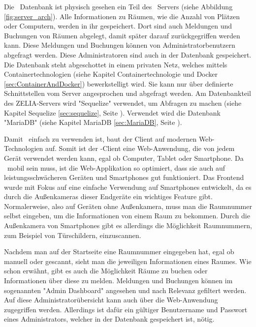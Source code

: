 Die \ZELIA\ Datenbank ist physisch gesehen ein Teil des \ZELIA\ Servers (siehe Abbildung \ref{fig:server_arch}). Alle Informationen zu Räumen, wie die Anzahl von Plätzen oder Computern, werden in ihr gespeichert. Dort sind auch Meldungen und Buchungen von Räumen abgelegt, damit später darauf zurückgegriffen werden kann. Diese Meldungen und Buchungen können von Administratorbenutzern abgefragt werden. Diese Administratoren sind auch in der Datenbank gespeichert. Die Datenbank steht abgeschottet in einem privaten Netz, welches mittels Containertechnologien (siehe Kapitel Containertechnologie und Docker \ref{sec:ContainerAndDocker}) bewerkstelligt wird. Sie kann nur über definierte Schnittstellen vom Server angesprochen und abgefragt werden. Am Datenbankteil des ZELIA-Servers wird "Sequelize" verwendet, um Abfragen zu machen (siehe Kapitel Sequelize \ref{sec:sequelize}, Seite \pageref{sec:sequelize}). Verwendet wird die Datenbank "MariaDB" (siehe Kapitel MariaDB \ref{sec:MariaDB}, Seite \pageref{sec:sequelize}).



Damit \ZELIA\ einfach zu verwenden ist, baut der Client auf modernen Web-\linebreak Technologien auf. Somit ist der \ZELIA-Client eine Web-Anwendung,  die von jedem Gerät verwendet werden kann, egal ob Computer, Tablet oder Smartphone. Da \ZELIA\ mobil sein muss, ist die Web-Applikation so optimiert, dass sie auch auf leistungsschwächeren Geräten und Smartphones gut funktioniert. Das Frontend wurde mit Fokus auf eine einfache Verwendung auf Smartphones entwickelt, da es durch die Außenkameras dieser Endgeräte ein wichtiges Feature gibt. Normalerweise, also auf Geräten ohne Außenkamera, muss man die Raumnummer selbst eingeben, um die Informationen von einem Raum zu bekommen. Durch die Außenkamera von Smartphones gibt es allerdings die Möglichkeit Raumnummern, zum Beispiel von Türschildern, einzuscannen. 

Nachdem man auf der Startseite eine Raumnummer eingegeben hat, egal ob manuell oder gescannt, sieht man die jeweiligen Informationen eines Raumes. Wie schon erwähnt, gibt es auch die Möglichkeit Räume zu buchen oder Informationen über diese zu melden. Meldungen und Buchungen können im sogenannten "Admin Dashboard" angesehen und nach Relevanz gefiltert werden. Auf diese Administratorübersicht kann auch über die Web-Anwendung zugegriffen werden. Allerdings ist dafür ein gültiger Benutzername und Passwort eines Administrators, welcher in der Datenbank gespeichert ist, nötig.

